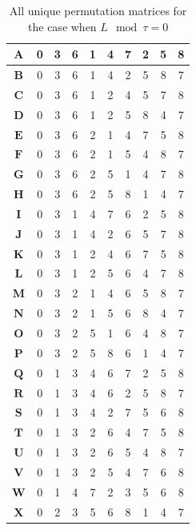 \documentclass[11pt, oneside, dvipdfmx]{book}
\begin{document}
\begin{table}[h!]
\centering
\begin{tabular}{|c || c  c  c  c  c  c  c  c  c |} 
 \hline
 $\mathbf{A}$ & 0 & 3 & 6 & 1 & 4 & 7 & 2 & 5 & 8\\ 
  \hline
  $\mathbf{B}$ & 0 & 3 & 6 & 1 & 4 & 2 & 5 & 8 & 7\\ 
  \hline
  $\mathbf{C}$ & 0 & 3 & 6 & 1 & 2 & 4 & 5 & 7 & 8\\ 
  \hline
  $\mathbf{D}$ & 0 & 3 & 6 & 1 & 2 & 5 & 8 & 4 & 7\\ 
 \hline
  $\mathbf{E}$ & 0 & 3 & 6 & 2 & 1 & 4 & 7 & 5 & 8\\ 
 \hline
 $\mathbf{F}$ & 0 & 3 & 6 & 2 & 1 & 5 & 4 & 8 & 7\\ 
 \hline
  $\mathbf{G}$ & 0 & 3 & 6 & 2 & 5 & 1 & 4 & 7 & 8\\ 
 \hline
  $\mathbf{H}$ & 0 & 3 & 6 & 2 & 5 & 8 & 1 & 4 & 7\\ 
 \hline
  $\mathbf{I}$ & 0 & 3 & 1 & 4 & 7 & 6 & 2 & 5 & 8\\ 
 \hline
  $\mathbf{J}$ & 0 & 3 & 1 & 4 & 2 & 6 & 5 & 7 & 8\\ 
 \hline
  $\mathbf{K}$ & 0 & 3 & 1 & 2 & 4 & 6 & 7 & 5 & 8\\ 
 \hline
 $\mathbf{L}$ & 0 & 3 & 1 & 2 & 5 & 6 & 4 & 7 & 8\\ 
 \hline
  $\mathbf{M}$ & 0 & 3 & 2 & 1 & 4 & 6 & 5 & 8 & 7\\ 
 \hline
  $\mathbf{N}$ & 0 & 3 & 2 & 1 & 5 & 6 & 8 & 4 & 7\\ 
 \hline
 $\mathbf{O}$ & 0 & 3 & 2 & 5 & 1 & 6 & 4 & 8 & 7\\ 
 \hline
 $\mathbf{P}$ & 0 & 3 & 2 & 5 & 8 & 6 & 1 & 4 & 7\\ 
 \hline
 $\mathbf{Q}$ & 0 & 1 & 3 & 4 & 6 & 7 & 2 & 5 & 8\\ 
 \hline
  $\mathbf{R}$ & 0 & 1 & 3 & 4 & 6 & 2 & 5 & 8 & 7\\ 
 \hline
 $\mathbf{S}$ & 0 & 1 & 3 & 4 & 2 & 7 & 5 & 6 & 8\\ 
 \hline
 $\mathbf{T}$ & 0 & 1 & 3 & 2 & 6 & 4 & 7 & 5 & 8\\ 
 \hline
 $\mathbf{U}$ & 0 & 1 & 3 & 2 & 6 & 5 & 4 & 8 & 7\\ 
 \hline
 $\mathbf{V}$ & 0 & 1 & 3 & 2 & 5 & 4 & 7 & 6 & 8\\ 
 \hline
 $\mathbf{W}$ & 0 & 1 & 4 & 7 & 2 & 3 & 5 & 6 & 8\\ 
 \hline
 $\mathbf{X}$ & 0 & 2 & 3 & 5 & 6 & 8 & 1 & 4 & 7\\ 
 \hline
\end{tabular}
\caption{All unique permutation matrices for the case when $L \mod \tau =0$}
\label{tb1}
\end{table}
 
\end{document}
